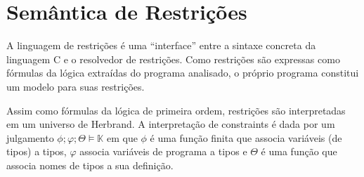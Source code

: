 \documentclass[a4paper,8pt]{article}
\begin{document}
     \section{Semântica de Restrições}\label{semantics}

     A linguagem de restrições é uma ``interface'' entre a sintaxe
     concreta da linguagem C e o resolvedor de restrições. Como
     restrições são expressas como fórmulas da lógica extraídas do 
     programa analisado, o próprio programa constitui um modelo 
     para suas restrições.

     Assim como fórmulas da lógica de primeira ordem, restrições são
     interpretadas em um universo de Herbrand. A interpretação de
     constraints é dada por um julgamento 
     $\phi ; \varphi ; \Theta \models \mathbb{K}$ em que $\phi$ é uma
     função finita que associa variáveis (de tipos) a tipos, $\varphi$
     associa variáveis de programa a tipos e $\Theta$ é uma função
     que associa nomes de tipos a sua definição.
\end{document}
